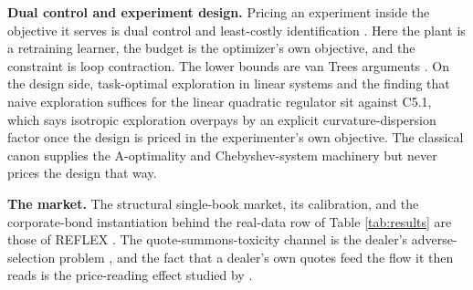 \textbf{Dual control and experiment design.} Pricing an experiment inside the
objective it serves is dual control \citep{feldbaum1960dual} and least-costly
identification \citep{bombois2006least}. Here the plant is a retraining
learner, the budget is the optimizer's own objective, and the constraint is
loop contraction. The lower bounds are van Trees arguments
\citep{gill1995applications}. On the design side, task-optimal exploration in
linear systems \citep{wagenmaker2021task} and the finding that
naive exploration suffices for the linear quadratic regulator
\citep{simchowitz2020naive} sit against C5.1, which says isotropic exploration
overpays by an explicit curvature-dispersion factor once the design is priced
in the experimenter's own objective. The classical canon
\citep{kiefer1960equivalence,pukelsheim2006optimal} supplies the A-optimality
and Chebyshev-system machinery but never prices the design that way.

\textbf{The market.} The structural single-book market, its calibration, and
the corporate-bond instantiation behind the real-data row of Table
\ref{tab:results} are those of REFLEX \citep{reflex2026}. The
quote-summons-toxicity channel is the dealer's adverse-selection problem
\citep{gueant2013inventory}, and the fact that a dealer's own quotes feed the
flow it then reads is the price-reading effect studied by
\citet{barzykin2026quoting}.
